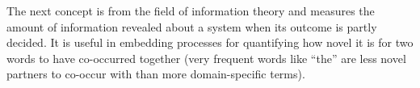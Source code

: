 The next concept is from the field of information theory and measures the amount of information revealed about a system when its outcome is partly decided. It is useful in embedding processes for quantifying how novel it is for two words to have co-occurred together (very frequent words like ``the'' are less novel partners to co-occur with than more domain-specific terms).

